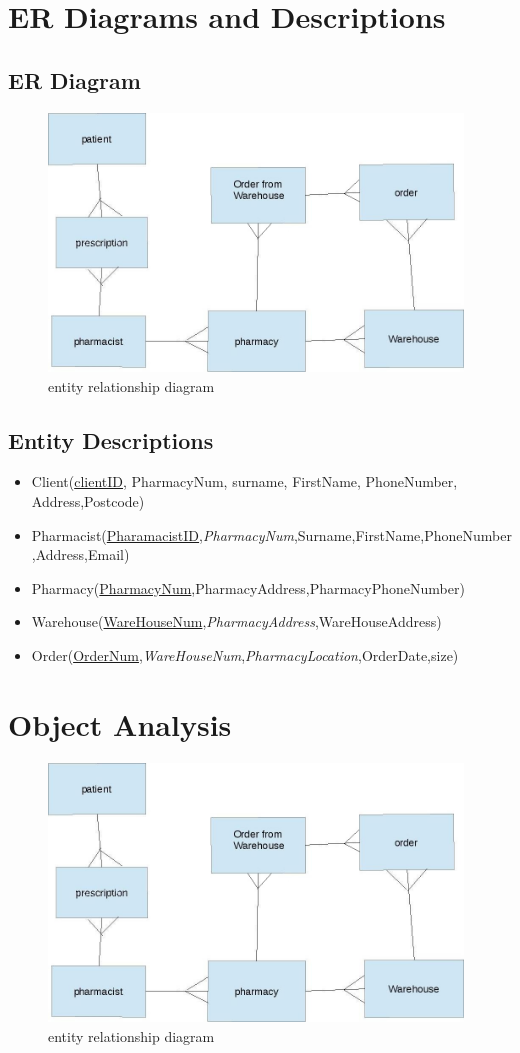 \section{ER Diagrams and Descriptions}
\subsection{ER Diagram}
\begin{figure}[ht!]
\centering
\includegraphics[width=110mm]{table1.JPG}
\caption{entity relationship diagram \label{overflow}}
\end{figure}
\pagebreak
\subsection{Entity Descriptions}
\begin{itemize}
\item Client(\underline{clientID}, PharmacyNum, surname, FirstName, PhoneNumber, Address,Postcode)
\item Pharmacist(\underline{PharamacistID},\emph{PharmacyNum},Surname,FirstName,PhoneNumber,Address,Email)
\item Pharmacy(\underline{PharmacyNum},PharmacyAddress,PharmacyPhoneNumber)
\item Warehouse(\underline{WareHouseNum},\emph{PharmacyAddress},WareHouseAddress)
\item Order(\underline{OrderNum},\emph{WareHouseNum},\emph{PharmacyLocation},OrderDate,size)
\end{itemize}
\section{Object Analysis}
\begin{figure}[ht!]
\centering
\includegraphics[width=110mm]{table1.JPG}
\caption{entity relationship diagram \label{overflow}}
\end{figure}

